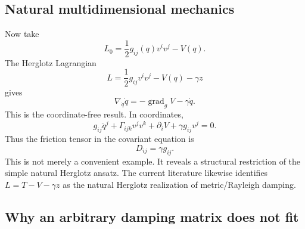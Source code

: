 \subsection{Natural multidimensional mechanics}

Now take
\begin{equation}
L_0 = \frac12 g_{ij}(q)v^iv^j-V(q). \tag{15} 
\end{equation}
The Herglotz Lagrangian
\begin{equation}
 \boxed{ L= \frac12g_{ij}v^iv^j-V(q)-\gamma z } \tag{16} 
\end{equation}
gives
\begin{equation}
 \nabla_{\dot q}\dot q = -\operatorname{grad}_g V -\gamma\dot q. \tag{17} 
\end{equation}
This is the coordinate-free result.
In coordinates,
\begin{equation}
 g_{ij}\ddot q^j + \Gamma_{ijk}v^jv^k + \partial_iV + \gamma g_{ij}v^j =0. \tag{18} 
\end{equation}
Thus the friction tensor in the covariant equation is
\begin{equation}
 \boxed{ D_{ij}=\gamma g_{ij}. } \tag{19} 
\end{equation}
This is not merely a convenient example. It reveals a structural restriction of the simple natural Herglotz ansatz. The current literature likewise identifies \(L=T-V-\gamma z\) as the natural Herglotz realization of metric/Rayleigh damping.

\subsection{Why an arbitrary damping matrix does not fit}

